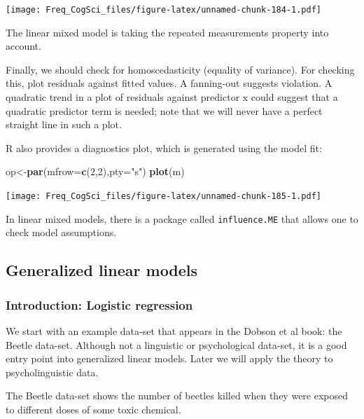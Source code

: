 \documentclass[12pt,]{krantz}
\newenvironment{Shaded}{\begin{snugshade}}{\end{snugshade}}
\newcommand{\DataTypeTok}[1]{\textcolor[rgb]{0.13,0.29,0.53}{#1}}
\newcommand{\DecValTok}[1]{\textcolor[rgb]{0.00,0.00,0.81}{#1}}
\newcommand{\KeywordTok}[1]{\textcolor[rgb]{0.13,0.29,0.53}{\textbf{#1}}}
\newcommand{\NormalTok}[1]{#1}
\newcommand{\StringTok}[1]{\textcolor[rgb]{0.31,0.60,0.02}{#1}}
\begin{document}
\texttt{[image: Freq\_CogSci\_files/figure-latex/unnamed-chunk-184-1.pdf]}

The linear mixed model is taking the repeated measurements property into account.

Finally, we should check for homoscedasticity (equality of variance).
For checking this, plot residuals against fitted values. A fanning-out suggests violation. A quadratic trend in a plot of residuals against predictor x could suggest that a quadratic predictor term is needed; note that we will never have a perfect straight line in such a plot.

R also provides a diagnostics plot, which is generated using the model fit:

\begin{Shaded}
\begin{Highlighting}[]
\NormalTok{op<-}\KeywordTok{par}\NormalTok{(}\DataTypeTok{mfrow=}\KeywordTok{c}\NormalTok{(}\DecValTok{2}\NormalTok{,}\DecValTok{2}\NormalTok{),}\DataTypeTok{pty=}\StringTok{"s"}\NormalTok{)}
\KeywordTok{plot}\NormalTok{(m)}
\end{Highlighting}
\end{Shaded}

\texttt{[image: Freq\_CogSci\_files/figure-latex/unnamed-chunk-185-1.pdf]}

In linear mixed models, there is a package called \texttt{influence.ME} \citep{influenceme} that allows one to check model assumptions.

\hypertarget{generalized-linear-models}{%
\subsection{Generalized linear models}\label{generalized-linear-models}}

\hypertarget{introduction-logistic-regression}{%
\subsubsection{Introduction: Logistic regression}\label{introduction-logistic-regression}}

We start with an example data-set that appears in the Dobson et al book: the Beetle data-set. Although not a linguistic or psychological data-set, it is a good entry point into generalized linear models. Later we will apply the theory to psycholinguistic data.

The Beetle data-set shows the number of beetles killed when they were exposed to different doses of some toxic chemical.
\end{document}
